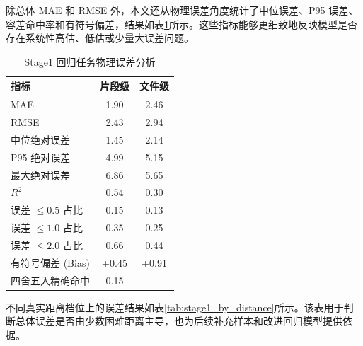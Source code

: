 除总体 MAE 和 RMSE 外，本文还从物理误差角度统计了中位误差、P95 误差、容差命中率和有符号偏差，结果如表\ref{tab:stage1_physical_error}所示。这些指标能够更细致地反映模型是否存在系统性高估、低估或少量大误差问题。

\begin{table}[!htbp]
  \centering
  \caption{Stage1 回归任务物理误差分析}
  \label{tab:stage1_physical_error}
  \vspace{0.5em}
  \wuhao
  \begin{tabular}{lcc}
    \toprule
    指标 & 片段级 & 文件级 \\
    \midrule
    MAE & 1.90 & 2.46 \\
    RMSE & 2.43 & 2.94 \\
    中位绝对误差 & 1.45 & 2.14 \\
    P95 绝对误差 & 4.99 & 5.15 \\
    最大绝对误差 & 6.86 & 5.65 \\
    $R^2$ & 0.54 & 0.30 \\
    误差 $\leq 0.5$ 占比 & 0.15 & 0.13 \\
    误差 $\leq 1.0$ 占比 & 0.35 & 0.25 \\
    误差 $\leq 2.0$ 占比 & 0.66 & 0.44 \\
    有符号偏差 (Bias) & +0.45 & +0.91 \\
    四舍五入精确命中 & 0.15 & — \\
    \bottomrule
  \end{tabular}
\end{table}

不同真实距离档位上的误差结果如表\ref{tab:stage1_by_distance}所示。该表用于判断总体误差是否由少数困难距离主导，也为后续补充样本和改进回归模型提供依据。

\begin{table}[!htbp]
  \centering
  \caption{Stage1 回归任务按距离档位误差（片段级）}
  \label{tab:stage1_by_distance}
  \vspace{0.5em}
  \wuhao
\end{table}


